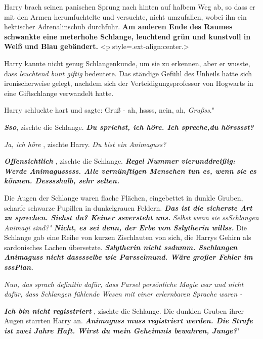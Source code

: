 Harry brach seinen panischen Sprung nach hinten auf halbem Weg ab, so dass er
mit den Armen herumfuchtelte und versuchte, nicht umzufallen, wobei ihn ein
hektischer Adrenalinschub durchfuhr.
\textbf{ Am anderen Ende des Raumes schwankte eine meterhohe Schlange, leuchtend
grün und kunstvoll in Weiß und Blau gebändert.}  <p
style=\grqq{}.ext-align:center\grqq{}.>

Harry kannte nicht genug Schlangenkunde, um sie zu erkennen, aber er wusste,
dass \emph{ \glqq{}leuchtend bunt\grqq{} \glqq{}giftig\grqq{}} bedeutete. Das
ständige Gefühl des Unheils hatte sich ironischerweise gelegt, nachdem sich der
Verteidigungsprofessor von Hogwarts in eine Giftschlange verwandelt hatte.

Harry schluckte hart und sagte: \glqq{}Gruß - ah, hssss, nein, ah,
\emph{Grußss}."

\glqq{}\textbf{\emph{Sso}}\grqq{}, zischte die Schlange. \textbf{\emph{\glqq{}Du
sprichst, ich höre. Ich spreche,du hörsssst?\grqq{}} }

\emph{\glqq{}Ja, ich höre\grqq{}} , zischte Harry. \emph{\glqq{}Du bist ein
Animaguss?\grqq{}}

\textbf{\emph{ \glqq{}Offensichtlich\grqq{}} }, zischte die Schlange.
\textbf{\emph{ \glqq{}Regel Nummer vierunddreißig: Werde Animagusssss. Alle
vernünftigen Menschen tun es, wenn sie es können. Desssshalb, sehr
selten.\grqq{}} }

Die Augen der Schlange waren flache Flächen, eingebettet in dunkle Gruben,
scharfe schwarze Pupillen in dunkelgrauen Feldern. \textbf{\emph{ \glqq{}Das ist
die sicherste Art zu sprechen. Siehst du? Keiner ssversteht uns.\grqq{}} }
\emph{\glqq{}Selbst wenn sie ssSchlangen Animagi sind?"} \textbf{\emph{ \glqq{}
Nicht, es sei denn, der Erbe von Sslytherin willss.\grqq{}} } Die Schlange gab
eine Reihe von kurzen Zischlauten von sich, die Harrys Gehirn als sardonisches
Lachen übersetzte. \textbf{\emph{ \glqq{}Sslytherin nicht ssdumm. Sschlangen
Animaguss nicht dasssselbe wie Parsselmund. Wäre großer Fehler im
sssPlan.\grqq{}} }

\emph{Nun, das sprach definitiv dafür, dass Parsel persönliche Magie war und
nicht dafür, dass Schlangen fühlende Wesen mit einer erlernbaren Sprache
waren -}

\textbf{\emph{ \glqq{}Ich bin nicht regisstriert\grqq{}} }, zischte die Schlange.
Die dunklen Gruben ihrer Augen starrten Harry an. \textbf{\emph{ \glqq{}Animaguss
muss registriert werden. Die Strafe ist zwei Jahre Haft. Wirst du mein Geheimnis
bewahren, Junge?}}"

